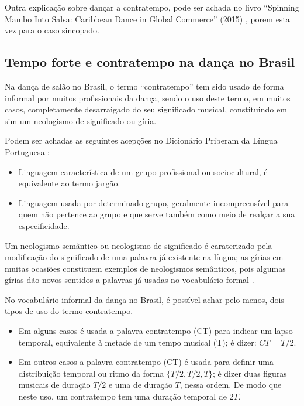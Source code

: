Outra explicação sobre dançar a contratempo, pode ser achada
no livro ``Spinning Mambo Into Salsa: Caribbean Dance in Global Commerce'' (2015) \cite[pp. 68]{mcmains2015spinning},
porem esta vez para o caso sincopado. 


\subsection{Tempo forte e contratempo na dança no Brasil}
\label{subsec:contratempobrasil}
Na dança de salão no Brasil, 
o termo ``contratempo'' tem sido usado de forma informal por muitos profissionais da dança,
sendo o uso deste termo, em muitos casos, completamente desarraigado do seu significado musical,
constituindo em sim um neologismo de significado ou gíria.

\begin{definition}[Gíria:] 
\label{def:Giria}
Podem ser achadas as seguintes acepções no Dicionário Priberam da Língua Portuguesa \cite{priberamgiria}:
\begin{itemize}
\item Linguagem característica de um grupo profissional ou sociocultural, é equivalente ao termo jargão.
\item Linguagem usada por determinado grupo, 
geralmente incompreensível para quem não pertence ao grupo e que serve também como meio de realçar a sua especificidade.
\end{itemize}
\end{definition}

\begin{definition} 
\label{def:NeologismoSemantico}
Um neologismo semântico ou neologismo de significado é caraterizado pela modificação 
do significado de uma palavra já existente na língua;
as gírias em muitas ocasiões constituem exemplos de neologismos semânticos, 
pois algumas gírias dão novos sentidos a palavras já usadas no vocabulário formal \cite[pp. 82-83]{correalingua}.
\end{definition}

No vocabulário informal da dança no Brasil,
é possível achar pelo menos, dois tipos de uso do termo contratempo.
\begin{itemize}
\item Em alguns casos é usada a palavra contratempo (CT) para indicar um lapso temporal, 
equivalente à metade de um tempo musical (T); é dizer: $CT=T/2$.
\item Em outros casos a palavra contratempo (CT) é usada para definir uma distribuição temporal 
ou ritmo da forma $\{T/2, T/2, T\}$; é dizer duas figuras musicais de duração $T/2$ e uma de duração $T$,
nessa ordem. De modo que neste uso, um contratempo tem uma duração temporal de $2T$. 
\end{itemize}

